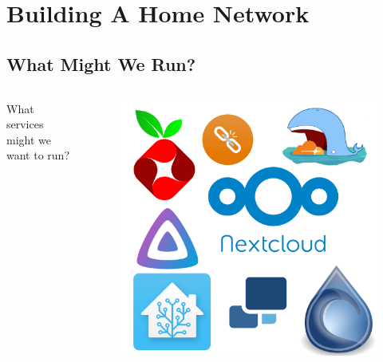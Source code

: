 \documentclass{beamer}
\begin{document}
\section{Building A Home Network}
\subsection{What Might We Run?}

\begin{frame}
    \begin{columns}
        \begin{column}{0.5\textwidth}
            What services might we want to run?
        \end{column}
        \begin{column}{0.5\textwidth}
            \begin{figure}
                \centering
                \includegraphics[width=\textwidth,keepaspectratio]{../resources/logos.png}
            \end{figure}
        \end{column}
    \end{columns}
\end{frame}
\end{document}
